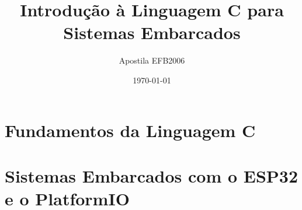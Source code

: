 \documentclass[11pt,a4paper,twoside,openright]{book}
\title{Introdução à Linguagem C para Sistemas Embarcados}
\author{Apostila EFB2006}
\date{\today}
\begin{document}


\frontmatter

\tableofcontents

\mainmatter

\part{Fundamentos da Linguagem C}












\part{Sistemas Embarcados com o ESP32 e o PlatformIO}













\appendix




\backmatter
\end{document}
